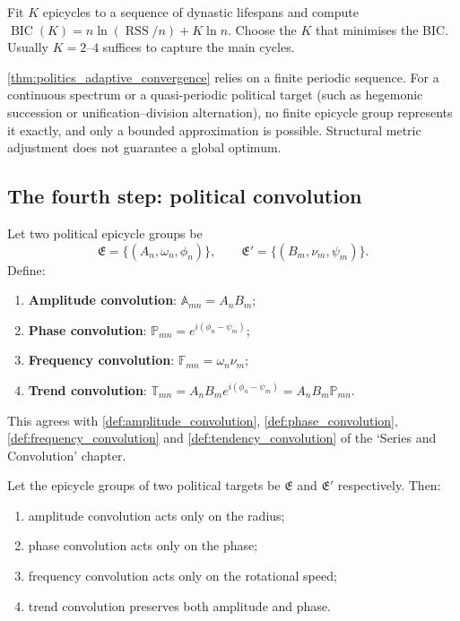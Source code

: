 \begin{example}\label{ex:politics_bic}
Fit $K$ epicycles to a sequence of dynastic lifespans and compute $\operatorname{BIC}(K)=n\ln(\operatorname{RSS}/n)+K\ln n$. Choose the $K$ that minimises the BIC. Usually $K=2$--$4$ suffices to capture the main cycles.
\end{example}

\begin{remark}\label{rem:politics_adaptive_boundary}
\cref{thm:politics_adaptive_convergence} relies on a finite periodic sequence. For a continuous spectrum or a quasi-periodic political target (such as hegemonic succession or unification--division alternation), no finite epicycle group represents it exactly, and only a bounded approximation is possible. Structural metric adjustment does not guarantee a global optimum.
\end{remark}

\subsection{The fourth step: political convolution}

\begin{definition}\label{def:politics_convolution_types}
Let two political epicycle groups be
\[
\mathfrak E=\{(A_n,\omega_n,\phi_n)\},\qquad
\mathfrak E'=\{(B_m,\nu_m,\psi_m)\}.
\]
Define:
\begin{enumerate}[label=(\roman*)]
    \item \textbf{Amplitude convolution}: $\mathbb A_{mn}=A_nB_m$;
    \item \textbf{Phase convolution}: $\mathbb P_{mn}=e^{i(\phi_n-\psi_m)}$;
    \item \textbf{Frequency convolution}: $\mathbb F_{mn}=\omega_n\nu_m$;
    \item \textbf{Trend convolution}: $\mathbb T_{mn}=A_nB_m e^{i(\phi_n-\psi_m)}=A_nB_m\mathbb P_{mn}$.
\end{enumerate}
This agrees with \cref{def:amplitude_convolution}, \cref{def:phase_convolution}, \cref{def:frequency_convolution} and \cref{def:tendency_convolution} of the `Series and Convolution' chapter.
\end{definition}

\begin{theorem}\label{thm:politics_convolution_action}
Let the epicycle groups of two political targets be $\mathfrak E$ and $\mathfrak E'$ respectively. Then:
\begin{enumerate}[label=(\roman*)]
    \item amplitude convolution acts only on the radius;
    \item phase convolution acts only on the phase;
    \item frequency convolution acts only on the rotational speed;
    \item trend convolution preserves both amplitude and phase.
\end{enumerate}
\end{theorem}

